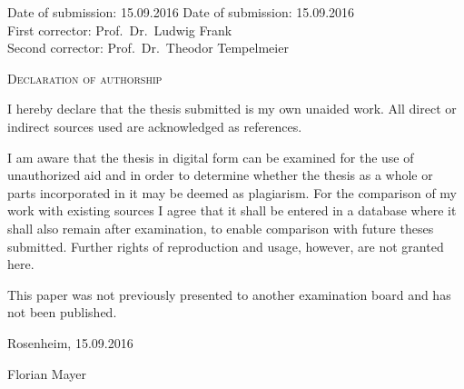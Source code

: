 \begin{titlepage}
\vspace{1cm}

\flushleft
 \Large
\vspace*{\fill}

\begin{tabbing}
    \textsf{Date of submission:} \= \textsf{15.09.2016} \kill
    \textsf{Date of submission:} \> \textsf{15.09.2016} \\
    \textsf{First corrector:} \> \textsf{Prof.\ Dr.\ Ludwig Frank}\\
    \textsf{Second corrector:} \> \textsf{Prof.\ Dr.\ Theodor Tempelmeier}
\end{tabbing}

\end{titlepage}

\cleardoubleemptypage

{
\large
\thispagestyle{empty}
\vspace*{\fill}

\noindent
\textsc{Declaration of authorship}

\medskip

\noindent
I hereby declare that the thesis submitted is my own unaided work. All direct or indirect sources used are acknowledged as references.

I am aware that the thesis in digital form can be examined for the use of unauthorized aid and in order to determine whether the thesis as a whole or parts incorporated in it may be deemed as plagiarism. For the comparison of my work with existing sources I agree that it shall be entered in a database where it shall also remain after examination, to enable comparison with future theses submitted. Further rights of reproduction and usage, however, are not granted here.

This paper was not previously presented to another examination board and has not been published.

\bigskip

\noindent
Rosenheim, 15.09.2016

\vspace*{2cm}

\noindent
Florian Mayer
}

